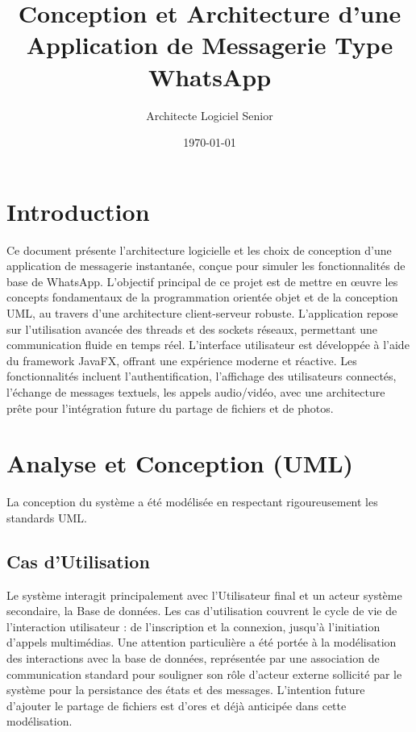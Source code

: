 \documentclass[12pt,a4paper]{article}
\title{Conception et Architecture d'une Application de Messagerie Type WhatsApp}
\author{Architecte Logiciel Senior}
\date{\today}
\begin{document}
\maketitle
\thispagestyle{empty}

\newpage
\tableofcontents
\newpage

\section{Introduction}
Ce document présente l'architecture logicielle et les choix de conception d'une application de messagerie instantanée, conçue pour simuler les fonctionnalités de base de WhatsApp. L'objectif principal de ce projet est de mettre en œuvre les concepts fondamentaux de la programmation orientée objet et de la conception UML, au travers d'une architecture client-serveur robuste. L'application repose sur l'utilisation avancée des threads et des sockets réseaux, permettant une communication fluide en temps réel. L'interface utilisateur est développée à l'aide du framework JavaFX, offrant une expérience moderne et réactive. Les fonctionnalités incluent l'authentification, l'affichage des utilisateurs connectés, l'échange de messages textuels, les appels audio/vidéo, avec une architecture prête pour l'intégration future du partage de fichiers et de photos.

\section{Analyse et Conception (UML)}
La conception du système a été modélisée en respectant rigoureusement les standards UML.

\subsection{Cas d'Utilisation}
Le système interagit principalement avec l'Utilisateur final et un acteur système secondaire, la Base de données. Les cas d'utilisation couvrent le cycle de vie de l'interaction utilisateur : de l'inscription et la connexion, jusqu'à l'initiation d'appels multimédias. Une attention particulière a été portée à la modélisation des interactions avec la base de données, représentée par une association de communication standard pour souligner son rôle d'acteur externe sollicité par le système pour la persistance des états et des messages. L'intention future d'ajouter le partage de fichiers est d'ores et déjà anticipée dans cette modélisation.
\end{document}
